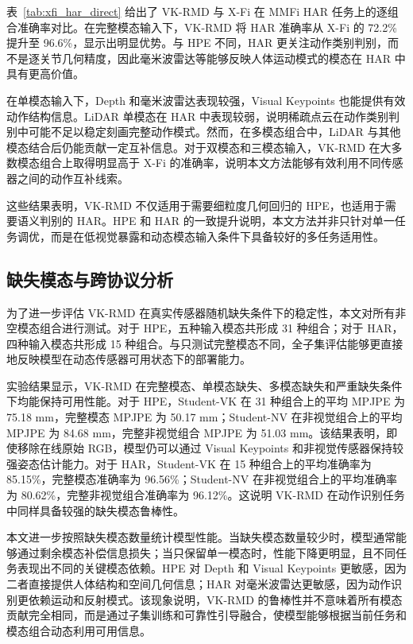 \documentclass[journal]{IEEEtran}
\newcommand{\parahead}[1]{\vspace{0.4em}\noindent{\textbf{#1}}}
\begin{document}
\parahead{人体活动识别。}
表~\ref{tab:xfi_har_direct} 给出了 VK-RMD 与 X-Fi 在 MMFi HAR 任务上的逐组合准确率对比。在完整模态输入下，VK-RMD 将 HAR 准确率从 X-Fi 的 72.2\% 提升至 96.6\%，显示出明显优势。与 HPE 不同，HAR 更关注动作类别判别，而不是逐关节几何精度，因此毫米波雷达等能够反映人体运动模式的模态在 HAR 中具有更高价值。 

在单模态输入下，Depth 和毫米波雷达表现较强，Visual Keypoints 也能提供有效动作结构信息。LiDAR 单模态在 HAR 中表现较弱，说明稀疏点云在动作类别判别中可能不足以稳定刻画完整动作模式。然而，在多模态组合中，LiDAR 与其他模态结合后仍能贡献一定互补信息。对于双模态和三模态输入，VK-RMD 在大多数模态组合上取得明显高于 X-Fi 的准确率，说明本文方法能够有效利用不同传感器之间的动作互补线索。

这些结果表明，VK-RMD 不仅适用于需要细粒度几何回归的 HPE，也适用于需要语义判别的 HAR。HPE 和 HAR 的一致提升说明，本文方法并非只针对单一任务调优，而是在低视觉暴露和动态模态输入条件下具备较好的多任务适用性。


\subsection{缺失模态与跨协议分析}

\parahead{全子集缺失模态评估。}
为了进一步评估 VK-RMD 在真实传感器随机缺失条件下的稳定性，本文对所有非空模态组合进行测试。对于 HPE，五种输入模态共形成 31 种组合；对于 HAR，四种输入模态共形成 15 种组合。与只测试完整模态不同，全子集评估能够更直接地反映模型在动态传感器可用状态下的部署能力。

实验结果显示，VK-RMD 在完整模态、单模态缺失、多模态缺失和严重缺失条件下均能保持可用性能。对于 HPE，Student-VK 在 31 种组合上的平均 MPJPE 为 75.18 mm，完整模态 MPJPE 为 50.17 mm；Student-NV 在非视觉组合上的平均 MPJPE 为 84.68 mm，完整非视觉组合 MPJPE 为 51.03 mm。该结果表明，即使移除在线原始 RGB，模型仍可以通过 Visual Keypoints 和非视觉传感器保持较强姿态估计能力。对于 HAR，Student-VK 在 15 种组合上的平均准确率为 85.15\%，完整模态准确率为 96.56\%；Student-NV 在非视觉组合上的平均准确率为 80.62\%，完整非视觉组合准确率为 96.12\%。这说明 VK-RMD 在动作识别任务中同样具备较强的缺失模态鲁棒性。

\parahead{缺失强度分析。}
本文进一步按照缺失模态数量统计模型性能。当缺失模态数量较少时，模型通常能够通过剩余模态补偿信息损失；当只保留单一模态时，性能下降更明显，且不同任务表现出不同的关键模态依赖。HPE 对 Depth 和 Visual Keypoints 更敏感，因为二者直接提供人体结构和空间几何信息；HAR 对毫米波雷达更敏感，因为动作识别更依赖运动和反射模式。该现象说明，VK-RMD 的鲁棒性并不意味着所有模态贡献完全相同，而是通过子集训练和可靠性引导融合，使模型能够根据当前任务和模态组合动态利用可用信息。
\end{document}

